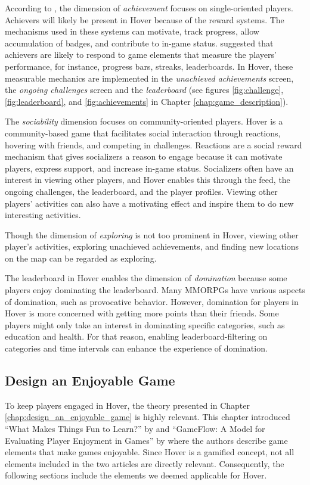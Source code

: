 According to \citet{hamari_player_2014}, the dimension of \textit{achievement} focuses on single-oriented players. Achievers will likely be present in Hover because of the reward systems. The mechanisms used in these systems can motivate, track progress, allow accumulation of badges, and contribute to in-game status. \citet{yee_motivations_2007} suggested that achievers are likely to respond to game elements that measure the players’ performance, for instance, progress bars, streaks, leaderboards. In Hover, these measurable mechanics are implemented in the \textit{unachieved achievements} screen, the \textit{ongoing challenges} screen and the \textit{leaderboard} (see figures \ref{fig:challenge}, \ref{fig:leaderboard}, and \ref{fig:achievements} in Chapter \ref{chap:game_description}).
    
The \textit{sociability} dimension focuses on community-oriented players. Hover is a community-based game that facilitates social interaction through reactions, hovering with friends, and competing in challenges. Reactions are a social reward mechanism that gives socializers a reason to engage because it can motivate players, express support, and increase in-game status. Socializers often have an interest in viewing other players, and Hover enables this through the feed, the ongoing challenges, the leaderboard, and the player profiles. Viewing other players’ activities can also have a motivating effect and inspire them to do new interesting activities. 

Though the dimension of \textit{exploring} is not too prominent in Hover, viewing other player’s activities, exploring unachieved achievements, and finding new locations on the map can be regarded as exploring.

The leaderboard in Hover enables the dimension of \textit{domination} because some players enjoy dominating the leaderboard. Many MMORPGs have various aspects of domination, such as provocative behavior. However, domination for players in Hover is more concerned with getting more points than their friends. Some players might only take an interest in dominating specific categories, such as education and health. For that reason, enabling leaderboard-filtering on categories and time intervals can enhance the experience of domination.

\subsection{Design an Enjoyable Game}
To keep players engaged in Hover, the theory presented in Chapter \ref{chap:design_an_enjoyable_game} is highly relevant. This chapter introduced “What Makes Things Fun to Learn?” by \citeauthor{malone_what_1980} and “GameFlow: A Model for Evaluating Player Enjoyment in Games” by \citeauthor{sweetser_gameflow_2005} where the authors describe game elements that make games enjoyable. Since Hover is a gamified concept, not all elements included in the two articles are directly relevant. Consequently, the following sections include the elements we deemed applicable for Hover.

